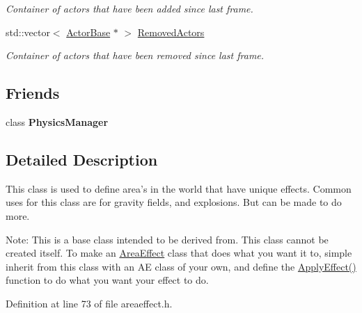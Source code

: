 \begin{DoxyCompactItemize}
\begin{DoxyCompactList}\small\item\em Container of actors that have been added since last frame. \item\end{DoxyCompactList}\item 
\hypertarget{classphys_1_1AreaEffect_a1b1b6cced61ead4d6de3d8bad5c2125a}{
std::vector$<$ \hyperlink{classphys_1_1ActorBase}{ActorBase} $\ast$ $>$ \hyperlink{classphys_1_1AreaEffect_a1b1b6cced61ead4d6de3d8bad5c2125a}{RemovedActors}}
\label{d4/d55/classphys_1_1AreaEffect_a1b1b6cced61ead4d6de3d8bad5c2125a}

\begin{DoxyCompactList}\small\item\em Container of actors that have been removed since last frame. \item\end{DoxyCompactList}\end{DoxyCompactItemize}
\subsection*{Friends}
\begin{DoxyCompactItemize}
\item 
\hypertarget{classphys_1_1AreaEffect_a139cf05ac01161b7071c8a037c841683}{
class {\bfseries PhysicsManager}}
\label{d4/d55/classphys_1_1AreaEffect_a139cf05ac01161b7071c8a037c841683}

\end{DoxyCompactItemize}


\subsection{Detailed Description}
This class is used to define area's in the world that have unique effects. Common uses for this class are for gravity fields, and explosions. But can be made to do more. \par
 Note: This is a base class intended to be derived from. This class cannot be created itself. To make an \hyperlink{classphys_1_1AreaEffect}{AreaEffect} class that does what you want it to, simple inherit from this class with an AE class of your own, and define the \hyperlink{classphys_1_1AreaEffect_a3b285ecfcf9c9200662d510e48dd222a}{ApplyEffect()} function to do what you want your effect to do. 

Definition at line 73 of file areaeffect.h.



